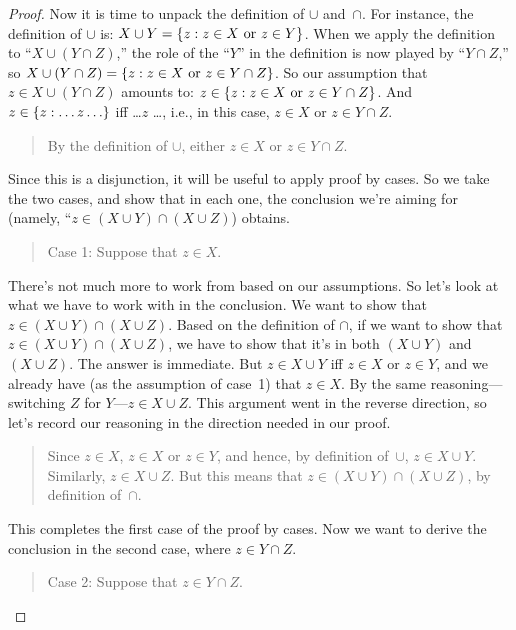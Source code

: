 \documentclass[../../../include/open-logic-section]{subfiles}
\begin{document}
\begin{proof}
Now it is time to unpack the definition of $\cup$ and~$\cap$. For
instance, the definition of $\cup$ is: $X \cup Y = \{ z : z \in X
  \text{ or } z \in Y \}$.  When we apply the definition to ``$X \cup (Y
\cap Z)$,'' the role of the ``$Y$'' in the definition is now played by
``$Y \cap Z$,'' so $X \cup (Y \cap Z) = \{ z : z \in X \text{ or }
  z \in Y \cap Z \}$.  So our assumption that $z \in X \cup (Y \cap Z)$
amounts to: $z \in \{ z : z \in X \text{ or } z \in Y \cap
  Z \}$. And $z \in \Setabs{z}{\dots z\dots}$ iff \dots $z$ \dots, i.e.,
in this case, $z \in X$ or $z \in Y \cap Z$.

\begin{quote}
By the definition of $\cup$, either $z \in X$ or $z \in Y \cap Z$.
\end{quote}

Since this is a disjunction, it will be useful to apply proof by
cases. So we take the two cases, and show that in each one, the
conclusion we're aiming for (namely, ``$z \in (X \cup Y) \cap (X \cup
Z)$) obtains.

\begin{quote}
Case 1: Suppose that $z \in X$.
\end{quote}

There's not much more to work from based on our assumptions. So let's
look at what we have to work with in the conclusion. We want to show
that $z \in (X \cup Y) \cap (X \cup Z)$. Based on the definition of
$\cap$, if we want to show that $z \in (X \cup Y) \cap (X \cup Z)$, we
have to show that it's in both $(X \cup Y)$ and $(X \cup Z)$. The
answer is immediate. But $z \in X \cup Y$ iff $z \in X$ or $z \in Y$,
and we already have (as the assumption of case~1) that $z \in X$. By
the same reasoning---switching $Z$ for $Y$---$z \in X \cup Z$. This
argument went in the reverse direction, so let's record our reasoning
in the direction needed in our proof.

\begin{quote}
Since $z \in X$, $z \in X$ or $z \in Y$, and hence, by definition
of~$\cup$, $z \in X \cup Y$. Similarly, $z \in X \cup Z$.  But this
means that $z \in (X \cup Y) \cap (X \cup Z)$, by definition
of~$\cap$.
\end{quote}

This completes the first case of the proof by cases. Now we want to
derive the conclusion in the second case, where $z \in Y \cap Z$.

\begin{quote}
Case 2: Suppose that $z \in Y \cap Z$.
\end{quote}


\end{proof}
\end{document}
